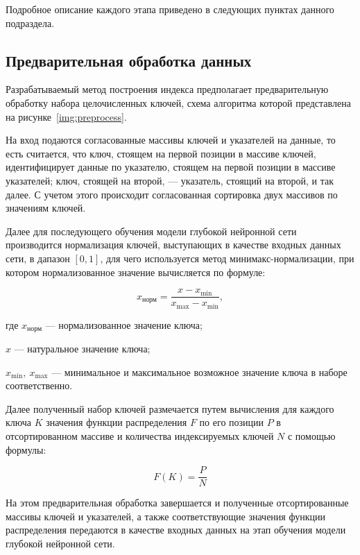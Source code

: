 Подробное описание каждого этапа приведено в следующих пунктах данного
подраздела.

\subsection{Предварительная обработка данных}

Разрабатываемый метод построения индекса предполагает предварительную обработку
набора целочисленных ключей, схема алгоритма которой представлена на
рисунке~\ref{img:preprocess}.


На вход подаются согласованные массивы ключей и указателей на данные, то есть
считается, что ключ, стоящем на первой позиции в массиве ключей, идентифицирует
данные по указателю, стоящем на первой позиции в массиве указателей; ключ,
стоящей на второй, --- указатель, стоящий на второй, и так далее. С учетом этого
происходит согласованная сортировка двух массивов по значениям ключей.

Далее для последующего обучения модели глубокой нейронной сети производится
нормализация ключей, выступающих в качестве входных данных сети, в дапазон $[0,
1]$, для чего используется метод минимакс-нормализации, при котором
нормализованное значение вычисляется по формуле:

\begin{equation}
    x_{\text{норм}}= \frac{x - x_{\text{min}}}{x_{\text{max}} - x_{\text{min}}},
\end{equation}

где $x_{\text{норм}}$ --- нормализованное значение ключа;

$x$ --- натуральное значение ключа;

$x_{\text{min}},~x_{\text{max}}$ --- минимальное и максимальное возможное
значение ключа в наборе соответственно.

Далее полученный набор ключей размечается путем вычисления для каждого ключа $K$
значения функции распределения $F$ по его позиции $P$ в отсортированном массиве
и количества индексируемых ключей $N$ с помощью формулы:

\begin{equation}
    F(K) = \frac{P}{N}
\end{equation}

На этом предварительная обработка завершается и полученные отсортированные
массивы ключей и указателей, а также соответствующие значения функции
распределения передаются в качестве входных данных на этап обучения модели
глубокой нейронной сети.

